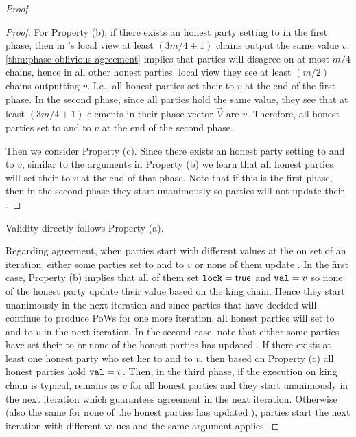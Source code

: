 \begin{proof}
\begin{proof}
        For Property (b), if there exists an honest party \party setting \decide to \true in the first phase, then in \party's local view at least $(3m / 4 + 1)$ chains output the same value $v$.
        \cref{thm:phase-oblivious-agreement} implies that parties will disagree on at most $m / 4$ chains, hence in all other honest parties' local view they see at least $(m / 2)$ chains outputting $v$.
        I.e., all honest parties set their \val to $v$ at the end of the first phase.
        In the second phase, since all parties hold the same value, they see that at least $(3m / 4 + 1)$ elements in their phase vector $\vec{V}$ are $v$.
        Therefore, all honest parties set \lock to \true and \val to $v$ at the end of the second phase.

        Then we consider Property (c).
        Since there exists an honest party \party setting \lock to \true and \val to $v$, similar to the arguments in Property (b) we learn that all honest parties will set their \val to $v$ at the end of that phase.
        Note that if this is the first phase, then in the second phase they start unanimously so parties will not update their \val.
    \end{proof}

    Validity directly follows Property (a).

    Regarding agreement, when parties start with different values at the on set of an iteration, either some parties set \decide to \true and \val to $v$ or none of them update \decide.
    In the first case, Property (b) implies that all of them set $\mathtt{lock} = \mathsf{true}$ and $\mathtt{val} = v$ so none of the honest party update their value based on the king chain.
    Hence they start unanimously in the next iteration and since parties that have decided will continue to produce PoWs for one more iteration, all honest parties will set \decide to \true and \val to $v$ in the next iteration.
    In the second case, note that either some parties have set their \lock to \true or none of the honest parties has updated \lock.
    If there exists at least one honest party who set her \lock to \true and \val to $v$, then based on Property (c) all honest parties hold $\mathtt{val} = v$.
    Then, in the third phase, if the execution on king chain is typical, \val remains as $v$ for all honest parties and they start unanimously in the next iteration which guarantees agreement in the next iteration.
    Otherwise (also the same for none of the honest parties has updated \lock), parties start the next iteration with different values and the same argument applies.


\end{proof}
